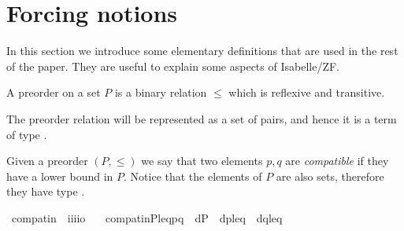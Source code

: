 \section{Forcing notions}\label{sec:forcing-notions}

In this section we introduce some elementary definitions that are used
in the rest of the paper. They are useful to explain some aspects of
Isabelle/ZF.

\begin{definition}
  A preorder on a set $P$ is a binary relation ${\leqslant}$ which is
  reflexive and transitive.
\end{definition}

The preorder relation will be represented as a set of pairs, and hence
it is a term of type
.
\begin{definition}
  Given a preorder $(P,\leqslant)$ we say that two elements $p,q$ are
  \emph{compatible} if they have a lower bound in $P$. Notice that
  the elements of $P$ are also sets, therefore they have type
  .
  \begin{isabelle}%
  \isamarkupfalse%
\ compat{\isacharunderscore}in\ {\isacharcolon}{\isacharcolon}\ {\isachardoublequoteopen}i{\isasymRightarrow}i{\isasymRightarrow}i{\isasymRightarrow}i{\isasymRightarrow}o{\isachardoublequoteclose}\ \isanewline
\ \ {\isachardoublequoteopen}compat{\isacharunderscore}in{\isacharparenleft}P{\isacharcomma}leq{\isacharcomma}p{\isacharcomma}q{\isacharparenright}\ {\isacharequal}{\isacharequal}\ {\isasymexists}d{\isasymin}P\ {\isachardot}\ {\isasymlangle}d{\isacharcomma}p{\isasymrangle}{\isasymin}leq\ {\isasymand}\ {\isasymlangle}d{\isacharcomma}q{\isasymrangle}{\isasymin}leq{\isachardoublequoteclose}
\end{isabelle}
\end{definition}

